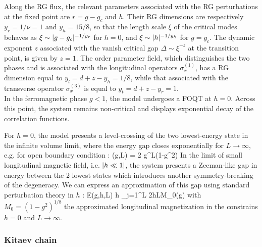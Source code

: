 Along the RG flux, the relevant parameters associated with the RG perturbations at the 
fixed point are $r = g-g_c$ and $h$. Their RG dimensions are respectively $y_r=1/\nu=1$
and $y_h = 15/8$, so that the length scale $\xi$ of the critical modes behaves as
$\xi \sim \lvert g-g_c\rvert^{-1/y_r}$ for $h=0$, and $\xi \sim \lvert h\rvert^{-1/y_h}$ for $g=g_c$.
The dynamic exponent $z$ associated with the vanish critical gap $\Delta \sim \xi^{-z}$
at the transition point, is given by $z=1$. The order parameter field, which distinguishes 
the two phases and is associated with the longitudinal operators $\sigma_x^{(1)}$, has a
RG dimension equal to $y_l = d+z-y_h=1/8$, while that associated with the transverse
operator $\sigma_x^{(3)}$ is equal to $y_t = d+z-y_r = 1$.\\

In the ferromagnetic phase $g<1$, the model undergoes a FOQT at $h=0$. Across this point,
the system remains non-critical and displays exponential decay of the correlation 
functions.

For $h=0$, the model presents a level-crossing of the two lowest-energy state in the
infinite volume limit, where the energy gap closes exponentially for $L\to \infty$, e.g.
for open boundary condition \cite{cabrera1987role}:
	\Delta(g,L) = 2 g^L(1-g^2)  \pt
\ee
In the limit of small longitudinal magnetic field, i.e. $\lvert h \ll 1\rvert$, the system
presents a Zeeman-like gap in energy between the 2 lowest states which introduces another
symmetry-breaking of the degeneracy. We can express an approximation of this gap using
standard perturbation theory in $h$ \cite{campostrini2014finite}:
	{\cal E}(g,h,L)  h \sum_{j=1}^{L}
	 \simeq 2hLM_0(g) \cm
\ee
with $M_0 = (1-g^2)^{1/8}$ the approximated longitudinal magnetization in the constrains
$h = 0$ and $L\to \infty$.



\subsubsection{Kitaev chain}
\label{kitaev}

